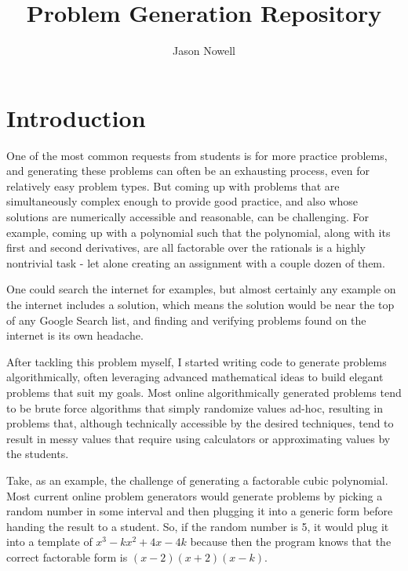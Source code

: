 \documentclass{article}
\title{Problem Generation Repository}
\author{Jason Nowell}
\begin{document}
\maketitle

\tableofcontents



\section{Introduction}
    
        One of the most common requests from students is for more practice problems, and generating these problems can often be an exhausting process, even for relatively easy problem types. But coming up with problems that are simultaneously complex enough to provide good practice, and also whose solutions are numerically accessible and reasonable, can be challenging. For example, coming up with a polynomial such that the polynomial, along with its first and second derivatives, are all factorable over the rationals is a highly nontrivial task - let alone creating an assignment with a couple dozen of them.
        
        One could search the internet for examples, but almost certainly any example on the internet includes a solution, which means the solution would be near the top of any Google Search list, and finding and verifying problems found on the internet is its own headache.
        
        After tackling this problem myself, I started writing code to generate problems algorithmically, often leveraging advanced mathematical ideas to build elegant problems that suit my goals. Most online algorithmically generated problems tend to be brute force algorithms that simply randomize values ad-hoc, resulting in problems that, although technically accessible by the desired techniques, tend to result in messy values that require using calculators or approximating values by the students.
        
        Take, as an example, the challenge of generating a factorable cubic polynomial. Most current online problem generators would generate problems by picking a random number in some interval and then plugging it into a generic form before handing the result to a student. So, if the random number is 5, it would plug it into a template of $x^3 - kx^2 + 4x - 4k$ because then the program knows that the correct factorable form is $(x-2)(x+2)(x-k)$.
        
\end{document}
